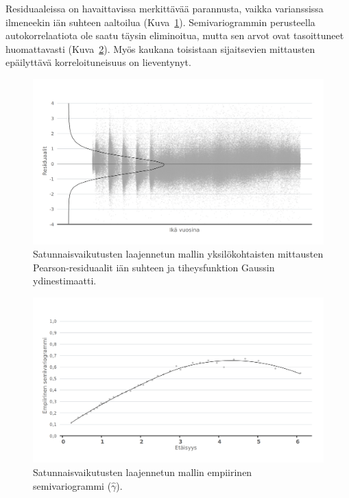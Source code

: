 \documentclass[finnish]{docopts}
\begin{document}
Residuaaleissa on havaittavissa merkittävää parannusta, vaikka varianssissa ilmeneekin iän suhteen aaltoilua (Kuva~\ref{fig:lme2_ika_vc_resid}). Semivariogrammin perusteella autokorrelaatiota ole saatu täysin eliminoitua, mutta sen arvot ovat tasoittuneet huomattavasti (Kuva~\ref{fig:lme2_vc_vario}). Myös kaukana toisistaan sijaitsevien mittausten epäilyttävä korreloituneisuus on lieventynyt.\\

\begin{figure}[H]
\centering
  \includegraphics[scale=0.8]{kuvaajat/lme2_ika_vc_residuaalit.png}
  \caption{Satunnaisvaikutusten laajennetun mallin yksilökohtaisten mittausten Pearson-residuaalit iän suhteen ja tiheysfunktion Gaussin ydinestimaatti.}
  \label{fig:lme2_ika_vc_resid}
\end{figure}

\begin{figure}[H]
\centering
  \includegraphics[scale=0.8]{kuvaajat/lme2_vc_vario.png}
  \caption{Satunnaisvaikutusten laajennetun mallin empiirinen semivariogrammi ($\hat{\gamma}$).}
  \label{fig:lme2_vc_vario}
\end{figure}
\end{document}
